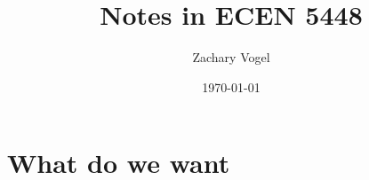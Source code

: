 \documentclass{article}
\author{Zachary Vogel}
\date{\today}
\title{Notes in ECEN 5448}
\begin{document}
\maketitle


\section*{What do we want}
\end{document}
